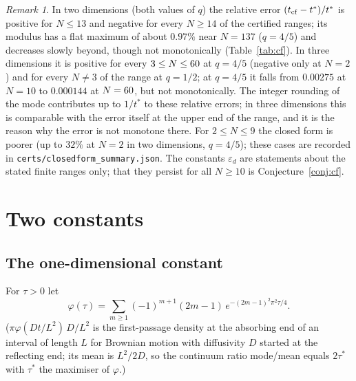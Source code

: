 \documentclass[11pt,a4paper]{article}
\theoremstyle{definition}
\theoremstyle{remark}
\newtheorem{remark}[theorem]{Remark}
\begin{document}
\begin{table}[!htbp]\centering\small

\caption{Certified bounds for the relative error of the closed form on sub-ranges. The last column is an interval containing $(t_{\rm cf}-t^*)/t^*$ for every $N$ of the range. For $q=1$ the mode is the raw (parity-affected) argmax.}\label{tab:cf}
\end{table}

\begin{remark}\label{rem:cfshape}
In two dimensions (both values of $q$) the relative error $(t_{\rm cf}-t^*)/t^*$ is positive for $N\le13$ and negative for every $N\ge14$ of the certified ranges; its modulus has a flat maximum of about $0.97\%$ near $N=137$ ($q=4/5$) and decreases slowly beyond, though not monotonically (Table~\ref{tab:cf}). In three dimensions it is positive for every $3\le N\le60$ at $q=4/5$ (negative only at $N=2$) and for every $N\ne3$ of the range at $q=1/2$; at $q=4/5$ it falls from $0.00275$ at $N=10$ to $0.000144$ at $N=60$, but not monotonically. The integer rounding of the mode contributes up to $1/t^*$ to these relative errors; in three dimensions this is comparable with the error itself at the upper end of the range, and it is the reason why the error is not monotone there. For $2\le N\le9$ the closed form is poorer (up to $32\%$ at $N=2$ in two dimensions, $q=4/5$); these cases are recorded in \texttt{certs/closedform\_summary.json}. The constants $\varepsilon_d$ are statements about the stated finite ranges only; that they persist for all $N\ge10$ is Conjecture~\ref{conj:cf}.
\end{remark}

\section{Two constants}

\subsection{The one-dimensional constant}

For $\tau>0$ let
\[
\varphi(\tau)=\sum_{m\ge1}(-1)^{m+1}(2m-1)\,e^{-(2m-1)^2\pi^2\tau/4}.
\]
($\pi\varphi(Dt/L^2)\,D/L^2$ is the first-passage density at the absorbing end of an interval of length $L$ for Brownian motion with diffusivity $D$ started at the reflecting end; its mean is $L^2/2D$, so the continuum ratio mode/mean equals $2\tau^*$ with $\tau^*$ the maximiser of $\varphi$.)
\end{document}
